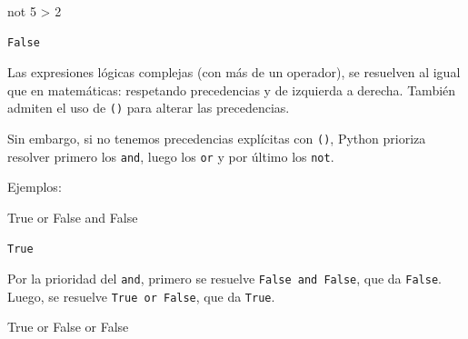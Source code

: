 \documentclass[
  letterpaper,
  DIV=11,
  numbers=noendperiod]{scrreprt}
\newenvironment{Shaded}{\begin{snugshade}}{\end{snugshade}}
\newcommand{\DecValTok}[1]{\textcolor[rgb]{0.68,0.00,0.00}{#1}}
\newcommand{\KeywordTok}[1]{\textcolor[rgb]{0.00,0.23,0.31}{#1}}
\newcommand{\OperatorTok}[1]{\textcolor[rgb]{0.37,0.37,0.37}{#1}}
\newcommand{\VariableTok}[1]{\textcolor[rgb]{0.07,0.07,0.07}{#1}}
\begin{document}
\begin{Shaded}
\begin{Highlighting}[]
\KeywordTok{not} \DecValTok{5} \OperatorTok{\textgreater{}} \DecValTok{2}
\end{Highlighting}
\end{Shaded}

\begin{verbatim}
False
\end{verbatim}

\begin{tcolorbox}[enhanced jigsaw, bottomrule=.15mm, leftrule=.75mm, opacityback=0, colback=white, toprule=.15mm, bottomtitle=1mm, opacitybacktitle=0.6, rightrule=.15mm, left=2mm, arc=.35mm, coltitle=black, title=\textcolor{quarto-callout-caution-color}{\faFire}\hspace{0.5em}{Prioridad de Operadores}, breakable, toptitle=1mm, colframe=quarto-callout-caution-color-frame, titlerule=0mm, colbacktitle=quarto-callout-caution-color!10!white]

Las expresiones lógicas complejas (con más de un operador), se resuelven
al igual que en matemáticas: respetando precedencias y de izquierda a
derecha. También admiten el uso de \texttt{()} para alterar las
precedencias.

Sin embargo, si no tenemos precedencias explícitas con \texttt{()},
Python prioriza resolver primero los \texttt{and}, luego los \texttt{or}
y por último los \texttt{not}.

Ejemplos:

\begin{Shaded}
\begin{Highlighting}[]
\VariableTok{True} \KeywordTok{or} \VariableTok{False} \KeywordTok{and} \VariableTok{False}
\end{Highlighting}
\end{Shaded}

\begin{verbatim}
True
\end{verbatim}

Por la prioridad del \texttt{and}, primero se resuelve
\texttt{False\ and\ False}, que da \texttt{False}. Luego, se resuelve
\texttt{True\ or\ False}, que da \texttt{True}.

\begin{Shaded}
\begin{Highlighting}[]
\VariableTok{True} \KeywordTok{or} \VariableTok{False} \KeywordTok{or} \VariableTok{False}
\end{Highlighting}
\end{Shaded}


\end{tcolorbox}
\end{document}
